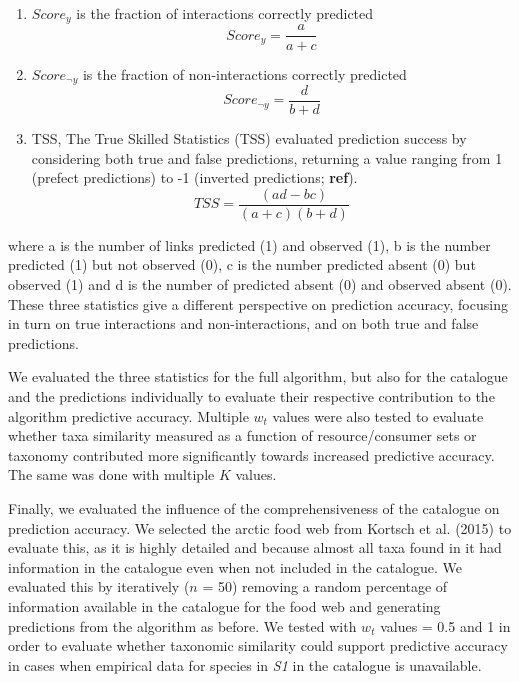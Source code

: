 \documentclass[letterpaper]{article}
\begin{document}
\begin{enumerate}
 \item $Score_y$ is the fraction of interactions correctly predicted
     \begin{equation}
         Score_y = \frac{a}{a + c}
     \end{equation}

 \item $Score_{\neg y}$ is the fraction of non-interactions correctly predicted
     \begin{equation}
       Score_{\neg y}  = \frac{d}{b + d}
     \end{equation}

 \item TSS, The True Skilled Statistics (TSS) evaluated prediction success by considering both true and false predictions, returning a value ranging from 1 (prefect predictions) to -1 (inverted predictions; \textbf{ref}). %
     \begin{equation}
       TSS = \frac{(ad - bc)}{(a + c)(b + d)}
     \end{equation}
\end{enumerate}

where a is the number of links predicted (1) and observed (1), b is the number predicted (1) but not observed (0), c is the number predicted absent (0) but observed (1) and d is the number of predicted absent (0) and observed absent (0). These three statistics give a different perspective on prediction accuracy, focusing in turn on true interactions and non-interactions, and on both true and false predictions.

We evaluated the three statistics for the full algorithm, but also for the catalogue and the predictions individually to evaluate their respective contribution to the algorithm predictive accuracy. Multiple $w_t$ values were also tested to evaluate whether taxa similarity measured as a function of resource/consumer sets or taxonomy contributed more significantly towards increased predictive accuracy. The same was done with multiple $K$ values.

Finally, we evaluated the influence of the comprehensiveness of the catalogue on prediction accuracy. We selected the arctic food web from Kortsch et al. (2015) to evaluate this, as it is highly detailed and because almost all taxa found in it had information in the catalogue even when not included in the catalogue. We evaluated this by iteratively ($n$ = 50) removing a random percentage of information available in the catalogue for the food web and generating predictions from the algorithm as before. We tested with $w_t$ values = 0.5 and 1 in order to evaluate whether taxonomic similarity could support predictive accuracy in cases when empirical data for species in \textit{S1} in the catalogue is unavailable.
\end{document}
